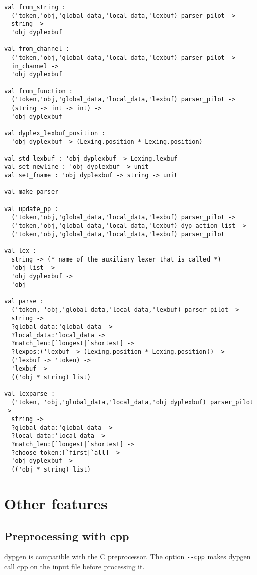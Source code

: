 \documentclass[12pt]{article}
\begin{document}
{\begin{verbatim}
val from_string :
  ('token,'obj,'global_data,'local_data,'lexbuf) parser_pilot ->
  string ->
  'obj dyplexbuf

val from_channel :
  ('token,'obj,'global_data,'local_data,'lexbuf) parser_pilot ->
  in_channel ->
  'obj dyplexbuf

val from_function :
  ('token,'obj,'global_data,'local_data,'lexbuf) parser_pilot ->
  (string -> int -> int) ->
  'obj dyplexbuf

val dyplex_lexbuf_position :
  'obj dyplexbuf -> (Lexing.position * Lexing.position)

val std_lexbuf : 'obj dyplexbuf -> Lexing.lexbuf
val set_newline : 'obj dyplexbuf -> unit
val set_fname : 'obj dyplexbuf -> string -> unit

val make_parser

val update_pp :
  ('token,'obj,'global_data,'local_data,'lexbuf) parser_pilot ->
  ('token,'obj,'global_data,'local_data,'lexbuf) dyp_action list ->
  ('token,'obj,'global_data,'local_data,'lexbuf) parser_pilot

val lex :
  string -> (* name of the auxiliary lexer that is called *)
  'obj list ->
  'obj dyplexbuf ->
  'obj

val parse :
  ('token, 'obj,'global_data,'local_data,'lexbuf) parser_pilot ->
  string ->
  ?global_data:'global_data ->
  ?local_data:'local_data ->
  ?match_len:[`longest|`shortest] ->
  ?lexpos:('lexbuf -> (Lexing.position * Lexing.position)) ->
  ('lexbuf -> 'token) ->
  'lexbuf ->
  (('obj * string) list)

val lexparse :
  ('token, 'obj,'global_data,'local_data,'obj dyplexbuf) parser_pilot ->
  string ->
  ?global_data:'global_data ->
  ?local_data:'local_data ->
  ?match_len:[`longest|`shortest] ->
  ?choose_token:[`first|`all] ->
  'obj dyplexbuf ->
  (('obj * string) list)
\end{verbatim}

\section{Other features}

\subsection{Preprocessing with cpp}

dypgen is compatible with the C preprocessor. The option \verb|--cpp| makes dypgen call cpp on the input file before processing it.\\

}
\end{document}
